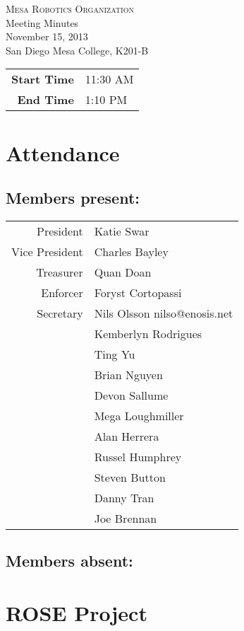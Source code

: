 \documentclass{article}
\begin{document}
\setlength{\extrarowheight}{2pt}


\begin{center}
\textsc{\LARGE Mesa Robotics Organization} \\[0.4cm]
{\Large Meeting Minutes} \\[0.4cm]
{\large November 15, 2013} \\[0.3cm]
{\large San Diego Mesa College, K201-B} \\[1.0cm]
\end{center}


\begin{tabular}{>{\bfseries}r l}
Start Time & 11:30 AM \\
End Time & 1:10 PM
\end{tabular}


\section{Attendance}
\subsection[Present]{Members present:}
\begin{tabularx}{\textwidth}{r X}
President & Katie Swar \\
Vice President & Charles Bayley \\
Treasurer & Quan Doan \\
Enforcer & Foryst Cortopassi \\
Secretary & Nils Olsson \dotfill nilso@enosis.net \\
& Kemberlyn Rodrigues \\
& Ting Yu \\
& Brian Nguyen \\
& Devon Sallume \\
& Mega Loughmiller \\
& Alan Herrera \\
& Russel Humphrey \\
& Steven Button \\
& Danny Tran \\
& Joe Brennan
\end{tabularx}

\subsection[Absent]{Members absent:}

\section{ROSE Project}
\end{document}
